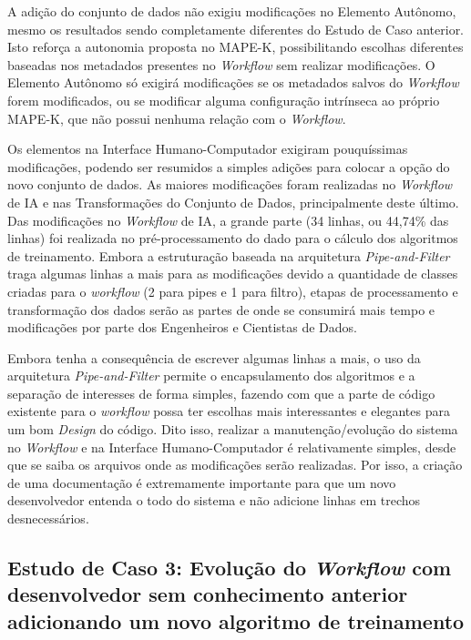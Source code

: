 \documentclass[twocolumn]{article}
\begin{document}
A adição do conjunto de dados não exigiu modificações no Elemento Autônomo, mesmo os resultados sendo completamente diferentes do Estudo de Caso anterior. Isto reforça a autonomia proposta no MAPE-K, possibilitando escolhas diferentes baseadas nos metadados presentes no \textit{Workflow} sem realizar modificações. O Elemento Autônomo só exigirá modificações se os metadados salvos do \textit{Workflow} forem modificados, ou se modificar alguma configuração intrínseca ao próprio MAPE-K, que não possui nenhuma relação com o \textit{Workflow}. 

Os elementos na Interface Humano-Computador exigiram pouquíssimas modificações, podendo ser resumidos a simples adições para colocar a opção do novo conjunto de dados. As maiores modificações foram realizadas no \textit{Workflow} de IA e nas Transformações do Conjunto de Dados, principalmente deste último. Das modificações no \textit{Workflow} de IA, a grande parte (34 linhas, ou 44,74\% das linhas) foi realizada no pré-processamento do dado para o cálculo dos algoritmos de treinamento. Embora a estruturação baseada na arquitetura \textit{Pipe-and-Filter} traga algumas linhas a mais para as modificações devido a quantidade de classes criadas para o \textit{workflow} (2 para pipes e 1 para filtro), etapas de processamento e transformação dos dados serão as partes de onde se consumirá mais tempo e modificações por parte dos Engenheiros e Cientistas de Dados.

Embora tenha a consequência de escrever algumas linhas a mais, o uso da arquitetura \textit{Pipe-and-Filter} permite o encapsulamento dos algoritmos e a separação de interesses de forma simples, fazendo com que a parte de código existente para o \textit{workflow} possa ter escolhas mais interessantes e elegantes para um bom \textit{Design} do código. Dito isso, realizar a manutenção/evolução do sistema no \textit{Workflow} e na Interface Humano-Computador é relativamente simples, desde que se saiba os arquivos onde as modificações serão realizadas. Por isso, a criação de uma documentação é extremamente importante para que um novo desenvolvedor entenda o todo do sistema e não adicione linhas em trechos desnecessários.

\subsection{Estudo de Caso 3: Evolução do \textit{Workflow} com desenvolvedor sem conhecimento anterior adicionando um novo algoritmo de treinamento}
\end{document}
